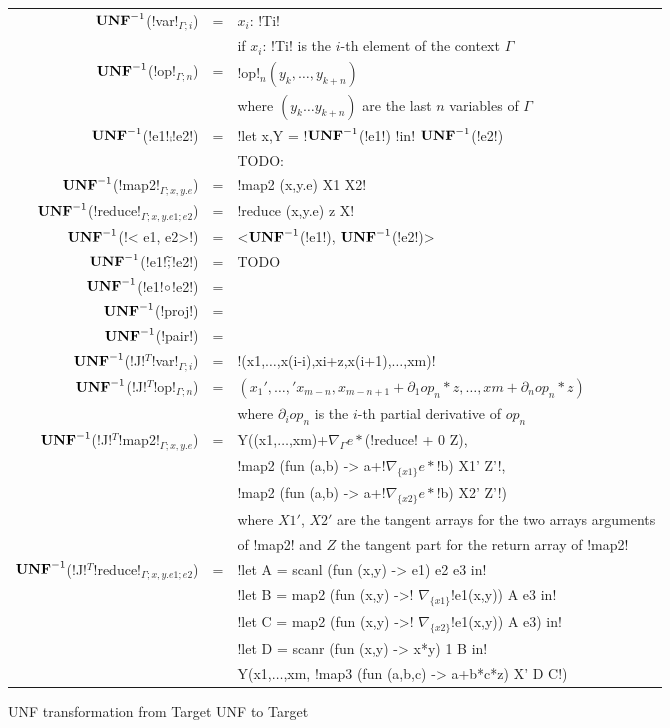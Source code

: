\begin{figure*}[t]
    \begin{tabular}{r c l}
    $\mathbf{UNF}^{-1}$(!var!$_{\Gamma;i}$) &=& $x_i$: !Ti! \\
    && if $x_i$: !Ti! is the $i$-th element of the context $\Gamma$ \\
    $\mathbf{UNF}^{-1}$(!op!$_{\Gamma;n}$) &=& !op!$_n(y_k,\ldots,y_{k+n})$ \\
    && where $(y_k\ldots y_{k+n})$ are the last $n$ variables of $\Gamma$ \\ 
    $\mathbf{UNF}^{-1}$(!e1!$\comp$!e2!) &=& !let x,Y = !$\mathbf{UNF}^{-1}$(!e1!) !in! $\mathbf{UNF}^{-1}$(!e2!) \\ 
    && TODO: \\ 
    $\mathbf{UNF}^{-1}$(!map2!$_{\Gamma;x,y.e}$) &=& !map2 (x,y.e) X1 X2! \\ 
    $\mathbf{UNF}^{-1}$(!reduce!$_{\Gamma;x,y.e1;e2}$) &=& !reduce (x,y.e) z X! \\ 
    $\mathbf{UNF}^{-1}$(!< e1, e2>!) &=& <$\mathbf{UNF}^{-1}$(!e1!), $\mathbf{UNF}^{-1}$(!e2!)> \\
    $\mathbf{UNF}^{-1}$(!e1!$\widetilde{;}$!e2!) &=& TODO \\
    $\mathbf{UNF}^{-1}$(!e1!$\circ$!e2!) &=& \\
    $\mathbf{UNF}^{-1}$(!proj!) &=& \\
    $\mathbf{UNF}^{-1}$(!pair!) &=& \\
    $\mathbf{UNF}^{-1}$(!J!$^T$!var!$_{\Gamma;i}$) &=& !(x1,$\ldots$,x(i-i),xi+z,x(i+1),$\ldots$,xm)! \\
    $\mathbf{UNF}^{-1}$(!J!$^T$!op!$_{\Gamma;n}$) &=& $(x_1',\ldots,'x_{m-n},x_{m-n+1}+\partial_1op_n*z,\ldots,xm+\partial_nop_n*z)$ \\
    && where $\partial_iop_n$ is the $i$-th partial derivative of $op_n$ \\
    $\mathbf{UNF}^{-1}$(!J!$^T$!map2!$_{\Gamma;x,y.e}$) &=&  Y((x1,$\ldots$,xm)+$\nabla_{\Gamma}e *$(!reduce! + 0 Z),\\
    && !map2 (fun (a,b) -> a+!$\nabla_{\{x1\}}e *$!b) X1' Z'!, \\
    && !map2 (fun (a,b) -> a+!$\nabla_{\{x2\}}e *$!b) X2' Z'!) \\
    && where $X1'$, $X2'$ are the tangent arrays for the two arrays arguments \\
    && of !map2! and $Z$ the tangent part for the return array of !map2! \\
    $\mathbf{UNF}^{-1}$(!J!$^T$!reduce!$_{\Gamma;x,y.e1;e2}$) &=& !let A = scanl (fun (x,y) -> e1) e2 e3 in! \\
    && !let B = map2 (fun (x,y) ->! $\nabla_{\{x1\}}$!e1(x,y)) A e3 in!\\
    && !let C = map2 (fun (x,y) ->! $\nabla_{\{x2\}}$!e1(x,y)) A e3) in!\\
    && !let D = scanr (fun (x,y) -> x*y) 1 B in!\\
    && Y(x1,$\ldots$,xm, !map3 (fun (a,b,c) -> a+b*c*z) X' D C!)
    \end{tabular}
    \caption{UNF transformation from Target UNF to Target}
    \label{fig:unf_to_target}
    \end{figure*}